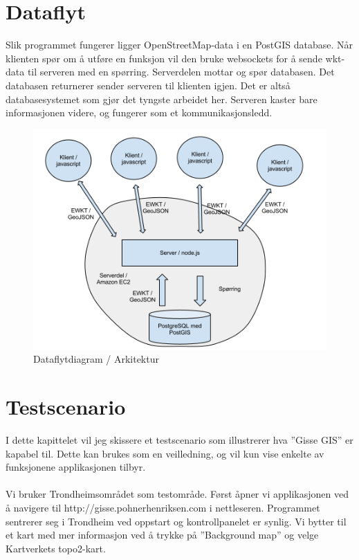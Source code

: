 \documentclass[12pt,twoside,onecolumn]{article}
\begin{document}
\section{Dataflyt}

	Slik programmet fungerer ligger OpenStreetMap-data i en PostGIS database. Når klienten spør om å utføre en funksjon vil den bruke websockets for å sende wkt-data til serveren med en spørring. Serverdelen mottar og spør databasen. Det databasen returnerer sender serveren til klienten igjen. Det er altså databasesystemet som gjør det tyngste arbeidet her. Serveren kaster bare informasjonen videre, og fungerer som et kommunikasjonsledd. 
	
	\begin{figure}[h]
	\centering
	\includegraphics[scale=0.4]{datadiagram.png}
	\caption{Dataflytdiagram / Arkitektur}
	\end{figure}

\section{Testscenario}

	I dette kapittelet vil jeg skissere et testscenario som illustrerer hva ''Gisse GIS'' er kapabel til. Dette kan brukes som en veilledning, og vil kun vise enkelte av funksjonene applikasjonen tilbyr.
	\\ \\
	Vi bruker Trondheimsområdet som testområde. Først åpner vi applikasjonen ved å navigere til http://gisse.pohnerhenriksen.com i nettleseren. Programmet sentrerer seg i Trondheim ved oppstart og kontrollpanelet er synlig. Vi bytter til et kart med mer informasjon ved å trykke på ''Background map'' og velge Kartverkets topo2-kart. 
	
\end{document}
